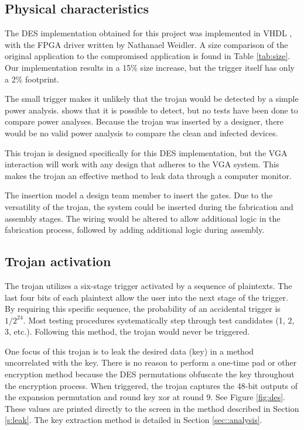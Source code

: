 	\subsection{Physical characteristics}
	The DES implementation obtained for this project was implemented in VHDL \cite{McQueen2003}, with the FPGA driver written by Nathanael Weidler. A size comparison of the original application to the compromised application is found in Table \ref{tab:size}. Our implementation results in a 15\% size increase, but the trigger itself has only a 2\% footprint.

	The small trigger makes it unlikely that the trojan would be detected by a simple power analysis. \cite{jha2008randomization} shows that it is possible to detect, but no tests have been done to compare power analyses. Because the trojan was inserted by a designer, there would be no valid power analysis to compare the clean and infected devices. 

	

	This trojan is designed specifically for this DES implementation, but the VGA interaction will work with any design that adheres to the VGA system. This makes the trojan an effective method to leak data through a computer monitor. 

	The insertion model a design team member to insert the gates.  Due to the versatility of the trojan, the system could be inserted during the fabrication and assembly stages. The wiring would be altered to allow additional logic in the fabrication process, followed by adding additional logic during assembly. 

	\subsection{Trojan activation}
	The trojan utilizes a six-stage trigger activated by a sequence of plaintexts. The last four bits of each plaintext allow the user into the next stage of the trigger. By requiring this specific sequence, the probability of an accidental trigger is $1/2^{24}$. Most testing procedures systematically step through test candidates (1, 2, 3, etc.). Following this method, the trojan would never be triggered. 

	One focus of this trojan is to leak the desired data (key) in a method uncorrelated with the key. There is no reason to perform a one-time pad or other encryption method because the DES permutations obfuscate the key throughout the encryption process. When triggered, the trojan captures the 48-bit outputs of the expansion permutation and round key xor at round 9. See Figure \ref{fig:des}. These values are printed directly to the screen in the method described in Section \ref{s:leak}. The key extraction method is detailed in Section \ref{sec::analysis}. 


